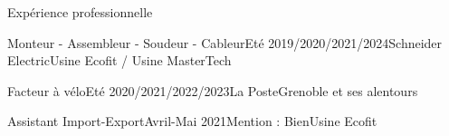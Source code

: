 \documentclass[11pt,]{resume}
\begin{document}

\begin{rSection}{Expérience professionnelle}
\begin{spacing}{0}
	\begin{rSubsection}{Monteur - Assembleur - Soudeur - Cableur}{Eté 2019/2020/2021/2024}{Schneider Electric}{Usine Ecofit / Usine MasterTech}

	\end{rSubsection}

	\begin{rSubsection}{Facteur à vélo}{Eté 2020/2021/2022/2023}{La Poste}{Grenoble et ses alentours}

	\end{rSubsection}

	\begin{rSubsection}{Assistant Import-Export}{Avril-Mai 2021}{Mention : Bien}{Usine Ecofit}

	\end{rSubsection}
\end{spacing}
\end{rSection}
\end{document}
